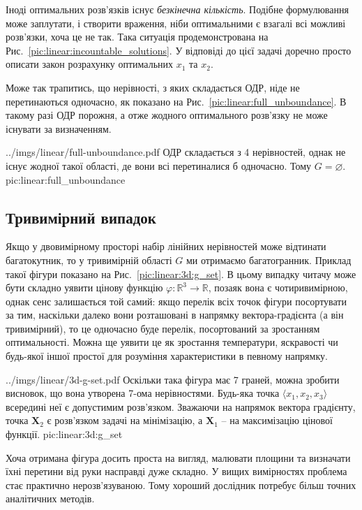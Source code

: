 \documentclass[\main/book.tex]{subfiles}
\begin{document}
Іноді оптимальних розв'язків існує \textit{безкінечна кількість}. Подібне формулювання може заплутати, і створити враження, ніби оптимальними є взагалі всі можливі розв'язки, хоча це не так. Така ситуація продемонстрована на Рис.~\ref{pic:linear:incountable_solutions}. У відповіді до цієї задачі доречно просто описати закон розрахунку оптимальних $x_1$ та $x_2$.

Може так трапитись, що нерівності, з яких складається ОДР, ніде не перетинаються одночасно, як показано на Рис.~\ref{pic:linear:full_unboundance}. В такому разі ОДР порожня, а отже жодного оптимального розв'язку не може існувати за визначенням.

\illustration
 {../imgs/linear/full-unboundance.pdf}
 {ОДР складається з 4 нерівностей, однак не існує жодної такої області, де вони всі перетиналися б одночасно. Тому $G = \varnothing$.}
 {pic:linear:full_unboundance}

\subsection{Тривимірний випадок}

Якщо у двовимірному просторі набір лінійних нерівностей може відтинати багатокутник, то у тривимірній області $G$ ми отримаємо багатогранник. Приклад такої фігури показано на Рис.~\ref{pic:linear:3d:g_set}. В цьому випадку читачу може бути складно уявити цінову функцію ${\varphi: \mathbb{R}^3 \rightarrow \mathbb{R}}$, позаяк вона є чотиривимірною, однак сенс залишається той самий: якщо перелік всіх точок фігури посортувати за тим, наскільки \flqq{}далеко\frqq{} вони розташовані в напрямку вектора-градієнта (а він тривимірний), то це одночасно буде перелік, посортований за зростанням оптимальності. Можна ще уявити це як зростання температури, яскравості чи будь-якої іншої простої для розуміння характеристики в певному напрямку.

\illustration
 {../imgs/linear/3d-g-set.pdf}
 {Оскільки така фігура має 7 граней, можна зробити висновок, що вона утворена 7-ома нерівностями. Будь-яка точка $\langle x_1, x_2, x_3 \rangle$ всередині неї є допустимим розв'язком. Зважаючи на напрямок вектора градієнту, точка $\mathbf{X}_2$ є розв'язком задачі на мінімізацію, а $\mathbf{X}_1$ -- на максимізацію цінової функції.}
 {pic:linear:3d:g_set}
 
\begin{note}
 Хоча отримана фігура досить проста на вигляд, малювати площини та визначати їхні перетини від руки насправді дуже складно. У вищих вимірностях проблема стає практично нерозв'язуваною. Тому хороший дослідник потребує більш точних аналітичних методів.
\end{note}
\end{document}
